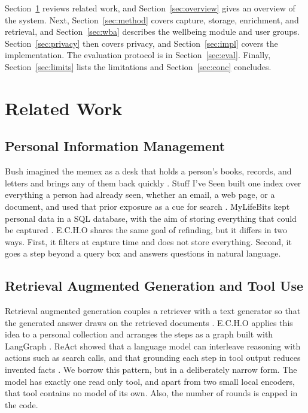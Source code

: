 \documentclass[conference]{IEEEtran}
\begin{document}
Section~\ref{sec:related} reviews related work, and Section~\ref{sec:overview} gives an overview of the system. Next, Section~\ref{sec:method} covers capture, storage, enrichment, and retrieval, and Section~\ref{sec:wba} describes the wellbeing module and user groups. Section~\ref{sec:privacy} then covers privacy, and Section~\ref{sec:impl} covers the implementation. The evaluation protocol is in Section~\ref{sec:eval}. Finally, Section~\ref{sec:limits} lists the limitations and Section~\ref{sec:conc} concludes.

\section{Related Work}\label{sec:related}
\subsection{Personal Information Management}
Bush imagined the memex as a desk that holds a person's books, records, and letters and brings any of them back quickly \cite{b1}. Stuff I've Seen built one index over everything a person had already seen, whether an email, a web page, or a document, and used that prior exposure as a cue for search \cite{b2}. MyLifeBits kept personal data in a SQL database, with the aim of storing everything that could be captured \cite{b3}. E.C.H.O shares the same goal of refinding, but it differs in two ways. First, it filters at capture time and does not store everything. Second, it goes a step beyond a query box and answers questions in natural language.

\subsection{Retrieval Augmented Generation and Tool Use}
Retrieval augmented generation couples a retriever with a text generator so that the generated answer draws on the retrieved documents \cite{b4}. E.C.H.O applies this idea to a personal collection and arranges the steps as a graph built with LangGraph \cite{b5}. ReAct showed that a language model can interleave reasoning with actions such as search calls, and that grounding each step in tool output reduces invented facts \cite{b13}. We borrow this pattern, but in a deliberately narrow form. The model has exactly one read only tool, and apart from two small local encoders, that tool contains no model of its own. Also, the number of rounds is capped in the code.
\end{document}
